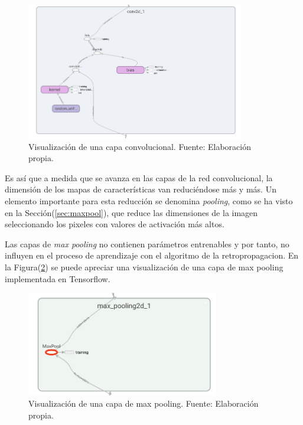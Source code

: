         \begin{figure}[!ht] 
            \centering
            \includegraphics[width=0.85\textwidth]{img/convlayer}
            \caption[Visualización de una capa convolucional]{Visualización de una capa convolucional. Fuente: Elaboración propia. }
            \label{fig:convlayer}
        \end{figure}

        Es así que a medida que se avanza en las capas de la red convolucional, la dimensión de los mapas de características 
        van reduciéndose más y más. Un elemento importante para esta reducción se denomina \textit{pooling}, como se ha visto 
        en la Sección(\ref{sec:maxpool}), que reduce las dimensiones de la imagen seleccionando los pixeles con valores de 
        activación más altos. 

        Las capas de \textit{max pooling} no contienen parámetros entrenables y por tanto, no influyen en el proceso 
        de aprendizaje con el algoritmo de la retropropagacion. En la Figura(\ref{fig:maxpooltf}) se puede apreciar 
        una visualización de una capa de max pooling implementada en Tensorflow.

         \begin{figure}[!ht] 
            \centering
            \includegraphics[width=0.75\textwidth]{img/maxpooltf}
            \caption[Visualización de una capa de max pooling]{Visualización de una capa de max pooling. Fuente: Elaboración propia. }
            \label{fig:maxpooltf}
        \end{figure}

